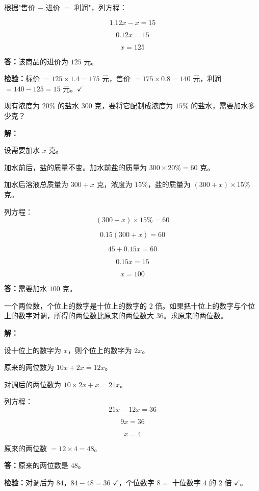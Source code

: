 \documentclass[12pt, a4paper]{ctexart}
\begin{document}
根据"售价 $-$ 进价 $=$ 利润"，列方程：

$$1.12x-x=15$$

$$0.12x=15$$

$$x=125$$

\textbf{答：}该商品的进价为 $125$ 元。

\textbf{检验：}标价 $=125\times 1.4=175$ 元，售价 $=175\times 0.8=140$ 元，利润 $=140-125=15$ 元。$\checkmark$

\vspace{6pt}

\begin{appbox}[【应用4】浓度问题]
现有浓度为 $20\%$ 的盐水 $300$ 克，要将它配制成浓度为 $15\%$ 的盐水，需要加水多少克？
\end{appbox}

\textbf{解：}

设需要加水 $x$ 克。

加水前后，盐的质量不变。加水前盐的质量为 $300\times 20\%=60$ 克。

加水后溶液总质量为 $300+x$ 克，浓度为 $15\%$，盐的质量为 $(300+x)\times 15\%$ 克。

列方程：
$$(300+x)\times 15\%=60$$

$$0.15(300+x)=60$$

$$45+0.15x=60$$

$$0.15x=15$$

$$x=100$$

\textbf{答：}需要加水 $100$ 克。

\vspace{6pt}

\begin{appbox}[【应用5】数字问题]
一个两位数，个位上的数字是十位上的数字的 $2$ 倍。如果把十位上的数字与个位上的数字对调，所得的两位数比原来的两位数大 $36$。求原来的两位数。
\end{appbox}

\textbf{解：}

设十位上的数字为 $x$，则个位上的数字为 $2x$。

原来的两位数为 $10x+2x=12x$。

对调后的两位数为 $10\times 2x+x=21x$。

列方程：
$$21x-12x=36$$

$$9x=36$$

$$x=4$$

原来的两位数 $=12\times 4=48$。

\textbf{答：}原来的两位数是 $48$。

\textbf{检验：}对调后为 $84$，$84-48=36$ $\checkmark$，个位数字 $8=$ 十位数字 $4$ 的 $2$ 倍 $\checkmark$。
\end{document}
